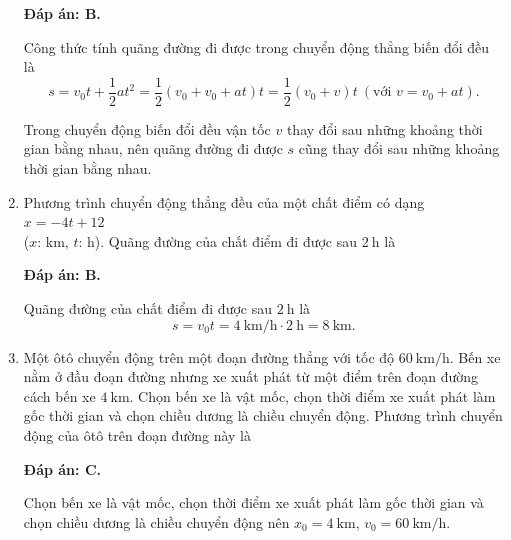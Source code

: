 \begin{enumerate}[label=\bfseries Câu \arabic*:]
{	}
	\loigiai
	{\textbf{Đáp án: B.}
		
		Công thức tính quãng đường đi được trong chuyển động thẳng biến đổi đều là
		$$s=v_0t+\dfrac{1}{2}at^2=\dfrac{1}{2}\left(v_0 + v_0+at \right) t=\dfrac{1}{2}\left(v_0+v\right) t\ (\text{với } v=v_0+at).$$
		
		Trong chuyển động biến đổi đều vận tốc $v$ thay đổi sau những khoảng thời gian bằng nhau, nên quãng đường đi được $s$ cũng thay đổi sau những khoảng thời gian bằng nhau.
		
		
	}
	\item {}
	
	\cauhoi
	{Phương trình chuyển động thẳng đều của một chất điểm có dạng $x=-4t+12$\\ ($x$: km, $t$: h). Quãng đường của chất điểm đi được sau $\SI{2}{\hour}$ là
	}
	\loigiai
	{\textbf{Đáp án: B.}	
		
		Quãng đường của chất điểm đi được sau $\SI{2}{\hour}$ là
		$$s=v_0t=\SI{4}{\kilo\meter/\hour}\cdot\SI{2}{\hour}=\SI{8}{\kilo\meter}.$$
		
		
	}
	\item {}
	
	\cauhoi
	{Một ôtô chuyển động trên một đoạn đường thẳng với tốc độ $\SI{60}{\kilo\meter/\hour}$. Bến xe nằm ở đầu đoạn đường nhưng xe xuất phát từ một điểm trên đoạn đường cách bến xe $\SI{4}{\kilo\meter}$. Chọn bến xe là vật mốc, chọn thời điểm xe xuất phát làm gốc thời gian và chọn chiều dương là chiều chuyển động. Phương trình chuyển động của ôtô trên đoạn đường này là
		
	}
	\loigiai
	{\textbf{Đáp án: C.}
		
		Chọn bến xe là vật mốc, chọn thời điểm xe xuất phát làm gốc thời gian và chọn chiều dương là chiều chuyển động nên $x_0=\SI{4}{\kilo\meter}$, $v_0=\SI{60}{\kilo\meter/\hour}$.
		
}
\end{enumerate}
